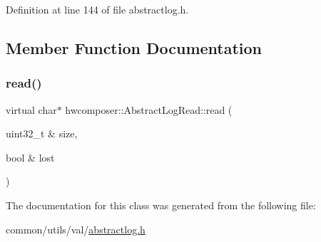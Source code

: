 Definition at line 144 of file abstractlog.\+h.


\begin{DoxyCode}{0}
\end{DoxyCode}


\subsection{Member Function Documentation}
\mbox{\label{classhwcomposer_1_1AbstractLogRead_af3f88b8c1b9e4ef6f881544d338302ef}} 
\subsubsection{\texorpdfstring{read()}{read()}}
{\footnotesize\ttfamily virtual char$\ast$ hwcomposer\+::\+Abstract\+Log\+Read\+::read (\begin{DoxyParamCaption}\item[{uint32\+\_\+t \&}]{size,  }\item[{bool \&}]{lost }\end{DoxyParamCaption})\hspace{0.3cm}{\ttfamily [pure virtual]}}



The documentation for this class was generated from the following file\+:\begin{DoxyCompactItemize}
\item 
common/utils/val/\mbox{\hyperlink{abstractlog_8h}{abstractlog.\+h}}\end{DoxyCompactItemize}

